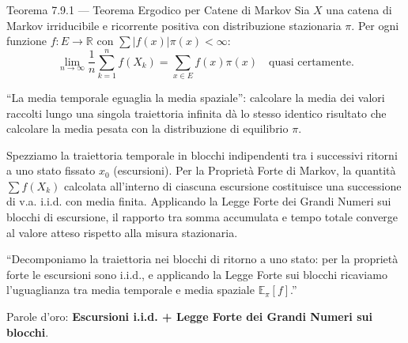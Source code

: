 \documentclass[11pt,a4paper]{report}
\begin{document}
\vspace{0.3cm}

\begin{teoremabox}{Teorema 7.9.1 --- Teorema Ergodico per Catene di Markov}
Sia $X$ una catena di Markov irriducibile e ricorrente positiva con distribuzione stazionaria $\pi$. Per ogni funzione $f: E \to \mathbb{R}$ con $\sum |f(x)|\pi(x) < \infty$:
\[
\lim_{n \to \infty} \frac{1}{n} \sum_{k=1}^n f(X_k) = \sum_{x \in E} f(x) \pi(x) \quad \text{quasi certamente}.
\]

\begin{cosafa}
``La media temporale eguaglia la media spaziale'': calcolare la media dei valori raccolti lungo una singola traiettoria infinita dà lo stesso identico risultato che calcolare la media pesata con la distribuzione di equilibrio $\pi$.
\end{cosafa}

\begin{dimostrazione}
Spezziamo la traiettoria temporale in blocchi indipendenti tra i successivi ritorni a uno stato fissato $x_0$ (escursioni). Per la Proprietà Forte di Markov, la quantità $\sum f(X_k)$ calcolata all'interno di ciascuna escursione costituisce una successione di v.a. i.i.d. con media finita. Applicando la Legge Forte dei Grandi Numeri sui blocchi di escursione, il rapporto tra somma accumulata e tempo totale converge al valore atteso rispetto alla misura stazionaria.
\end{dimostrazione}

\begin{oralbox}
``Decomponiamo la traiettoria nei blocchi di ritorno a uno stato: per la proprietà forte le escursioni sono i.i.d., e applicando la Legge Forte sui blocchi ricaviamo l'uguaglianza tra media temporale e media spaziale $\mathbb{E}_\pi[f]$.''
\end{oralbox}

\begin{tipbox}
Parole d'oro: \textbf{Escursioni i.i.d. + Legge Forte dei Grandi Numeri sui blocchi}.
\end{tipbox}
\end{teoremabox}
\end{document}
